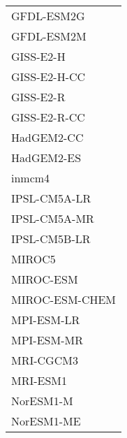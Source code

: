 \documentclass{ametsocV5}
\begin{document}
\begin{table}[t]
\begin{center}
\begin{tabular}{ l }
    GFDL-ESM2G      \\%
    GFDL-ESM2M      \\%
    GISS-E2-H       \\%
    GISS-E2-H-CC    \\%
    GISS-E2-R       \\%
    GISS-E2-R-CC    \\%
    HadGEM2-CC      \\%
    HadGEM2-ES      \\%
    inmcm4          \\%
    IPSL-CM5A-LR    \\%
    IPSL-CM5A-MR    \\%
    IPSL-CM5B-LR    \\%
    MIROC5          \\%
    MIROC-ESM       \\%
    MIROC-ESM-CHEM  \\%
    MPI-ESM-LR      \\%
    MPI-ESM-MR      \\%
    MRI-CGCM3       \\%
    MRI-ESM1        \\%
    NorESM1-M       \\%
    NorESM1-ME      \\%

  \end{tabular}
\end{center}
\end{table}
\end{document}
